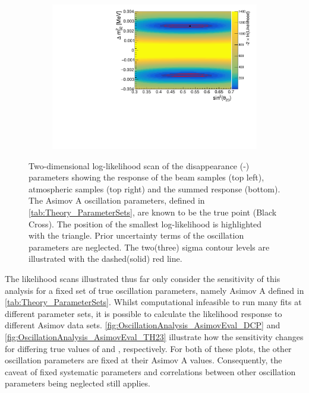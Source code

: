 \begin{figure}[h]
\begin{subfigure}[t]{1.0\textwidth}
    \includegraphics[width=\textwidth, trim={0mm 0mm 0mm 0mm}, clip,page=3]{Figures/OA/DisappearanceScans.pdf}
  \end{subfigure}
  \caption{Two-dimensional log-likelihood scan of the disappearance (-) parameters showing the response of the beam samples (top left), atmospheric samples (top right) and the summed response (bottom). The Asimov A oscillation parameters, defined in \autoref{tab:Theory_ParameterSets}, are known to be the true point (Black Cross). The position of the smallest log-likelihood is highlighted with the triangle. Prior uncertainty terms of the oscillation parameters are neglected. The two(three) sigma contour levels are illustrated with the dashed(solid) red line.}
  \label{fig:OscillationAnalysis_2DLLHOscScans_Dis}
\end{figure}

\clearpage

The likelihood scans illustrated thus far only consider the sensitivity of this analysis for a fixed set of true oscillation parameters, namely Asimov A defined in \autoref{tab:Theory_ParameterSets}. Whilst computational infeasible to run many fits at different parameter sets, it is possible to calculate the likelihood response to different Asimov data sets. \autoref{fig:OscillationAnalysis_AsimovEval_DCP} and \autoref{fig:OscillationAnalysis_AsimovEval_TH23} illustrate how the sensitivity changes for differing true values of  and , respectively. For both of these plots, the other oscillation parameters are fixed at their Asimov A values. Consequently, the caveat of fixed systematic parameters and correlations between other oscillation parameters being neglected still applies.

